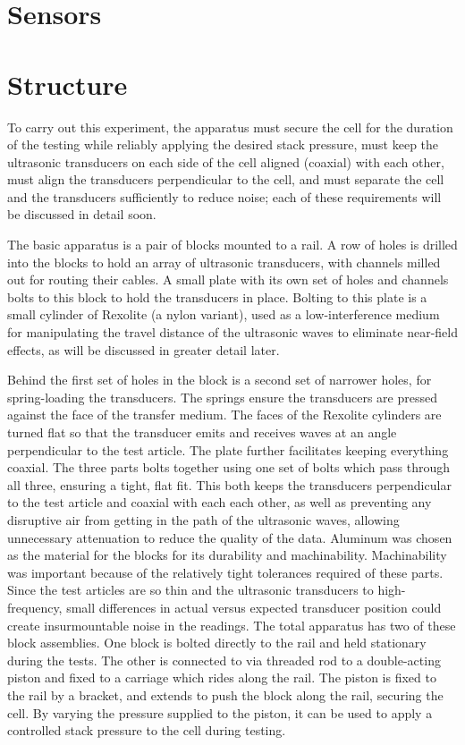 \section{Sensors}


\section{Structure}
To carry out this experiment, the apparatus must secure the cell for the duration of the testing while reliably applying the desired stack pressure, must keep the ultrasonic transducers on each side of the cell aligned (coaxial) with each other, must align the transducers perpendicular to the cell, and must separate the cell and the transducers sufficiently to reduce noise; each of these requirements will be discussed in detail soon.

The basic apparatus is a pair of blocks mounted to a rail. A row of holes is drilled into the blocks to hold an array of ultrasonic transducers, with channels milled out for routing their cables. A small plate with its own set of holes and channels bolts to this block to hold the transducers in place. Bolting to this plate is a small cylinder of Rexolite (a nylon variant), used as a low-interference medium for manipulating the travel distance of the ultrasonic waves to eliminate near-field effects, as will be discussed in greater detail later.

Behind the first set of holes in the block is a second set of narrower holes, for spring-loading the transducers. The springs ensure the transducers are pressed against the face of the transfer medium. The faces of the Rexolite cylinders are turned flat so that the transducer emits and receives waves at an angle perpendicular to the test article. The plate further facilitates keeping everything coaxial. The three parts bolts together using one set of bolts which pass through all three, ensuring a tight, flat fit. This both keeps the transducers perpendicular to the test article and coaxial with each each other, as well as preventing any disruptive air from getting in the path of the ultrasonic waves, allowing unnecessary attenuation to reduce the quality of the data. Aluminum was chosen as the material for the blocks for its durability and machinability. Machinability was important because of the relatively tight tolerances required of these parts. Since the test articles are so thin and the ultrasonic transducers to high-frequency, small differences in actual versus expected transducer position could create insurmountable noise in the readings. The total apparatus has two of these block assemblies. One block is bolted directly to the rail and held stationary during the tests. The other is connected to via threaded rod to a double-acting piston and fixed to a carriage which rides along the rail. The piston is fixed to the rail by a bracket, and extends to push the block along the rail, securing the cell. By varying the pressure supplied to the piston, it can be used to apply a controlled stack pressure to the cell during testing.

